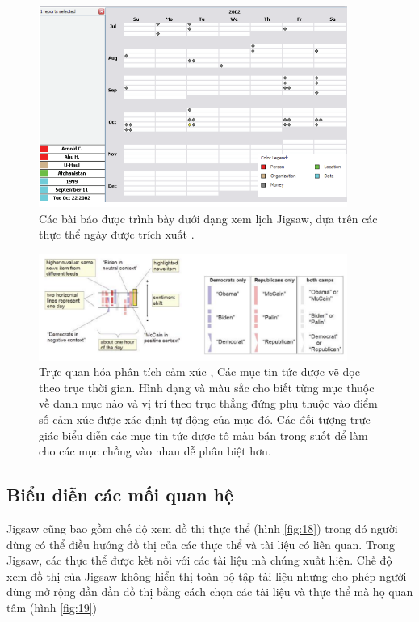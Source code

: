 \documentclass[14pt, a4paper]{article}
\numberwithin{equation}{section}
\numberwithin{figure}{section}
\numberwithin{dl}{section}
\numberwithin{md}{section}
\numberwithin{bd}{section}
\numberwithin{dn}{section}
\numberwithin{hq}{section}
\begin{document}
    \begin{figure}[h!]
        \centering
        \includegraphics[width=0.9\textwidth]{16.png}
        \caption{Các bài báo được trình bày dưới dạng xem lịch Jigsaw, dựa trên các thực thể ngày được trích xuất \cite{155}.}
        \label{fig:16}
    \end{figure}


    \begin{figure}[h!]
        \centering
        \includegraphics[width=0.9\textwidth]{17.png}
        \caption{Trực quan hóa phân tích cảm xúc \cite{440},
        Các mục tin tức được vẽ dọc theo trục thời gian.
        Hình dạng và màu sắc cho biết từng mục thuộc về danh mục nào và vị trí theo trục thẳng đứng phụ thuộc vào điểm số cảm xúc được xác định tự động của mục đó.
        Các đối tượng trực giác biểu diễn các mục tin tức được tô màu bán trong suốt để làm cho các mục chồng vào nhau dễ phân biệt hơn.}
        \label{fig:17}
    \end{figure}

    \subsection{Biểu diễn các mối quan hệ}

    Jigsaw \cite{155} cũng bao gồm chế độ xem đồ thị thực thể (hình \ref{fig:18}) trong đó người dùng có thể điều hướng đồ thị của các thực thể và tài liệu có liên quan.
    Trong Jigsaw, các thực thể được kết nối với các tài liệu mà chúng xuất hiện.
    Chế độ xem đồ thị của Jigsaw không hiển thị toàn bộ tập tài liệu nhưng cho phép người dùng mở rộng dần dần đồ thị bằng cách chọn các tài liệu và thực thể mà họ quan tâm (hình \ref{fig:19})
\end{document}
